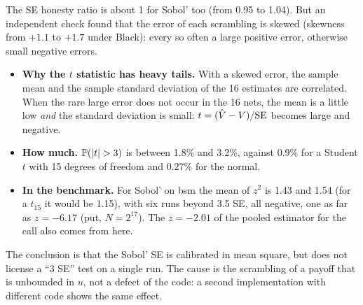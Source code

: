 \begin{attenzione}[title={The Sobol' SE is right on average, not in the tails}]
The SE honesty ratio is about 1 for Sobol' too (from 0.95 to 1.04). But an independent check found that the error of
each scrambling is skewed (skewness from $+1.1$ to $+1.7$ under Black): every so often a large positive error,
otherwise small negative errors.
\begin{itemize}
\item \textbf{Why the $t$ statistic has heavy tails.} With a skewed error, the sample mean and the sample standard
deviation of the 16 estimates are correlated. When the rare large error does not occur in the 16 nets, the mean is a
little low \emph{and} the standard deviation is small: $t=(\hat V-V)/\mathrm{SE}$ becomes large and negative.
\item \textbf{How much.} $\PP(|t|>3)$ is between 1.8\% and 3.2\%, against 0.9\% for a Student $t$ with 15 degrees of
freedom and 0.27\% for the normal.
\item \textbf{In the benchmark.} For Sobol' on bsm the mean of $z^2$ is 1.43 and 1.54 (for a $t_{15}$ it would be
1.15), with six runs beyond 3.5 SE, all negative, one as far as $z=-6.17$ (put, $N=2^{17}$). The $z=-2.01$ of the
pooled estimator for the call also comes from here.
\end{itemize}
The conclusion is that the Sobol' SE is calibrated in mean square, but does not license a ``3 SE'' test on a single
run. The cause is the scrambling of a payoff that is unbounded in $u$, not a defect of the code: a second
implementation with different code shows the same effect.
\end{attenzione}

